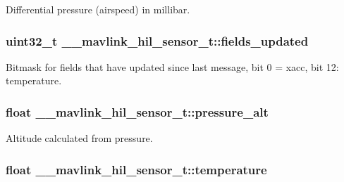 Differential pressure (airspeed) in millibar. 

\hypertarget{struct____mavlink__hil__sensor__t_a47ccb8d87933c760160e5f6f513f0e90}{
\subsubsection[{fields\+\_\+updated}]{\setlength{\rightskip}{0pt plus 5cm}uint32\+\_\+t \+\_\+\+\_\+mavlink\+\_\+hil\+\_\+sensor\+\_\+t\+::fields\+\_\+updated}}\label{struct____mavlink__hil__sensor__t_a47ccb8d87933c760160e5f6f513f0e90}


Bitmask for fields that have updated since last message, bit 0 = xacc, bit 12\+: temperature. 

\hypertarget{struct____mavlink__hil__sensor__t_aa7347c28c478d103f181d57aee8026de}{
\subsubsection[{pressure\+\_\+alt}]{\setlength{\rightskip}{0pt plus 5cm}float \+\_\+\+\_\+mavlink\+\_\+hil\+\_\+sensor\+\_\+t\+::pressure\+\_\+alt}}\label{struct____mavlink__hil__sensor__t_aa7347c28c478d103f181d57aee8026de}


Altitude calculated from pressure. 

\hypertarget{struct____mavlink__hil__sensor__t_a775825e9a485480f835e1b01c9ef878a}{
\subsubsection[{temperature}]{\setlength{\rightskip}{0pt plus 5cm}float \+\_\+\+\_\+mavlink\+\_\+hil\+\_\+sensor\+\_\+t\+::temperature}}\label{struct____mavlink__hil__sensor__t_a775825e9a485480f835e1b01c9ef878a}


